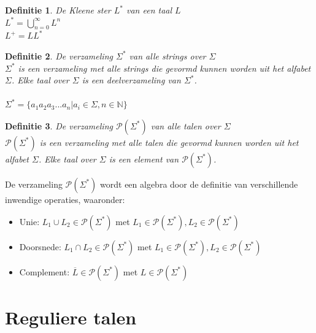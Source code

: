 \documentclass[a4paper]{article}
\newtheorem{tdefinitie}{Definitie}[section]
\newenvironment{definitie}[1]%
  {\begin{mdframed}[backgroundcolor=silver,
    topline=false,
    rightline=false,
    leftline=false,
    bottomline=false]\begin{tdefinitie}#1\\\normalfont}%
  {\end{tdefinitie}\end{mdframed}}
\newcommand{\perm}{\ensuremath{\mathcal{P}}}
\newcommand{\nat}{\ensuremath{\mathbb{N}}}
\begin{document}
\begin{definitie}{De Kleene ster $L^*$ van een taal $L$}
  $L^* = \bigcup^\infty_{n=0}L^n$
  \\ $L^+ = LL^*$
\end{definitie}

\begin{definitie}{De verzameling $\Sigma^*$ van alle strings over $\Sigma$}
  $\Sigma^*$ is een verzameling met alle strings die gevormd kunnen worden uit het alfabet $\Sigma$. Elke taal over $\Sigma$ is een deelverzameling van $\Sigma^*$. \\
  \\ $\Sigma^* = \{a_1a_2a_3...a_n|a_i \in \Sigma, n \in \nat\}$
\end{definitie}

\begin{definitie}{De verzameling $\perm(\Sigma^*)$ van alle talen over $\Sigma$}
  $\perm(\Sigma^*)$ is een verzameling met alle talen die gevormd kunnen worden uit het alfabet $\Sigma$. Elke taal over $\Sigma$ is een element van $\perm(\Sigma^*)$.
\end{definitie}

De verzameling $\perm(\Sigma^*)$ wordt een algebra door de definitie van verschillende inwendige operaties, waaronder:
\begin{itemize}
\item Unie: $L_1 \cup L_2 \in \perm(\Sigma^*)$ met $L_1 \in \perm(\Sigma^*), L_2 \in \perm(\Sigma^*)$
\item Doorsnede: $L_1 \cap L_2 \in \perm(\Sigma^*)$ met $L_1 \in \perm(\Sigma^*), L_2 \in \perm(\Sigma^*)$
\item Complement: $\overline{L} \in \perm(\Sigma^*)$ met $L \in \perm(\Sigma^*)$
\end{itemize}

\section{Reguliere talen}
  
\end{document}
